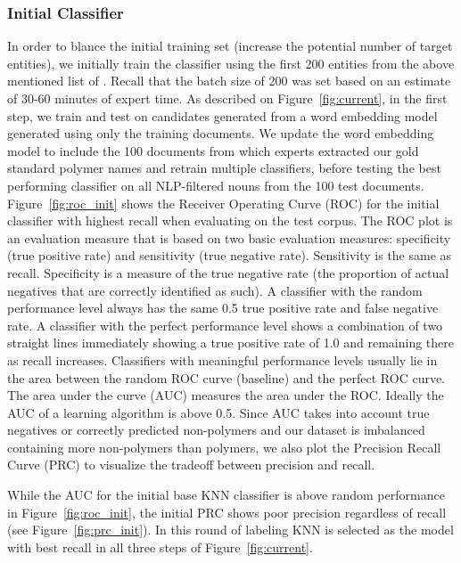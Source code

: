 \subsubsection{Initial Classifier}
In order to blance the initial training set (increase the potential number of target entities),
we initially train the classifier using the first
200 entities from the above mentioned list of .
Recall that the batch size of 200 was set based on an estimate of 30-60 minutes of expert time.
As described on Figure~\ref{fig:current}, in the first step, we train and test on candidates generated from a word embedding model generated using only the training documents. 
We update the word embedding model to include the 100 documents from which experts extracted our gold standard polymer names and retrain multiple classifiers, before testing the best performing classifier on all NLP-filtered nouns from the 100 test documents.
Figure~\ref{fig:roc_init} shows the Receiver Operating Curve (ROC) for the initial classifier with highest recall when evaluating on the test corpus. 
The ROC plot is an evaluation measure that is based on two basic evaluation measures: specificity (true positive rate) and sensitivity (true negative rate).
Sensitivity is the same as recall. Specificity is a measure of the true negative rate (the proportion of actual negatives that are correctly identified as such).
A classifier with the random performance level always has the same 0.5 true positive rate and false negative rate.
A classifier with the perfect performance level shows a combination of two straight lines immediately showing a true positive rate of 1.0 and remaining there as recall increases.
Classifiers with meaningful performance levels usually lie in the area between the random ROC curve (baseline) and the perfect ROC curve. 
The area under the curve (AUC) measures the area under the ROC.
Ideally the AUC of a learning algorithm is above 0.5. 
Since AUC takes into account true negatives or correctly predicted non-polymers and our dataset is imbalanced containing more non-polymers than polymers, we also plot the Precision Recall Curve (PRC) to visualize the tradeoff between precision and recall.

While the AUC for the initial base KNN classifier is above random performance in Figure~\ref{fig:roc_init}, the initial PRC shows poor precision regardless of recall (see Figure~\ref{fig:prc_init}).
In this round of labeling KNN is selected as the model with best recall in all three steps of Figure~\ref{fig:current}.\\

